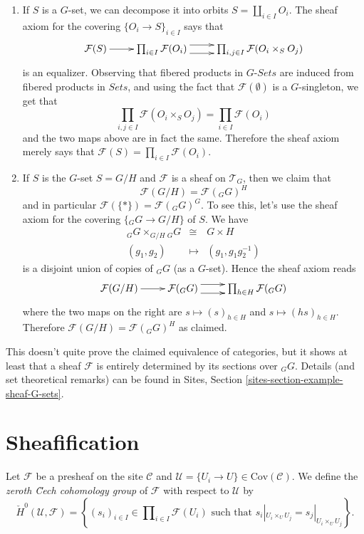 \begin{enumerate}
\item
If $S$ is a $G$-set, we can decompose it into orbits $S = \coprod_{i\in I}
O_i$. The sheaf axiom for the covering $\{O_i \to S\}_{i\in I}$ says that
$$
\xymatrix{
\mathcal{F}(S) \ar[r] &
\prod_{i\in I} \mathcal{F}(O_i) \ar@<1ex>[r] \ar@<-1ex>[r] &
\prod_{i,j \in I} \mathcal{F}(O_i \times_S O_j)
}
$$
is an equalizer. Observing that fibered products in $G\textit{-Sets}$ are
induced from fibered products in $\textit{Sets}$, and using the fact that
$\mathcal{F}(\emptyset)$ is a $G$-singleton, we get that
$$
\prod_{i,j \in I} \mathcal{F}(O_i \times_S O_j) = \prod_{i \in I}
\mathcal{F}(O_i)
$$
and the two maps above are in fact the same. Therefore the sheaf axiom merely
says that $\mathcal{F}(S) = \prod_{i\in I} \mathcal{F}(O_i)$.
\item
If $S$ is the $G$-set $S= G/H$ and $\mathcal{F}$ is a sheaf on $\mathcal{T}_G$,
then we claim that
$$
\mathcal{F}(G/H) = \mathcal{F}({}_G G)^H
$$
and in particular $\mathcal{F}(\{*\}) = \mathcal{F}({}_G G)^G$. To see this,
let's use the sheaf axiom for the covering $\{ {}_G G \to G/H \}$ of $S$. We
have
\begin{eqnarray*}
{}_G G \times_{G/H} {}_G G & \cong & G \times H \\
(g_1, g_2) & \longmapsto & (g_1, g_1 g_2^{-1})
\end{eqnarray*}
is a disjoint union of copies of ${}_G G$ (as a $G$-set). Hence the sheaf axiom
reads
$$
\xymatrix{
\mathcal{F} (G/H) \ar[r] &
\mathcal{F}({}_G G) \ar@<1ex>[r] \ar@<-1ex>[r] &
\prod_{h\in H} \mathcal{F}({}_G G)
}
$$
where the two maps on the right are $s \mapsto (s)_{h \in H}$ and $s \mapsto
(hs)_{h \in H}$. Therefore $\mathcal{F}(G/H) = \mathcal{F}({}_G G)^H$ as
claimed.
\end{enumerate}
This doesn't quite prove the claimed equivalence of categories, but it shows at
least that a sheaf $\mathcal{F}$ is entirely determined by its sections over
${}_G G$. Details (and set theoretical remarks) can be found in
Sites, Section \ref{sites-section-example-sheaf-G-sets}.




\section{Sheafification}
\label{section-sheafification}

\begin{definition}
\label{definition-0-cech}
Let $\mathcal{F}$ be a presheaf on the site $\mathcal{C}$ and
$\mathcal{U} = \{U_i \to U\} \in \text{Cov} (\mathcal{C})$.
We define the {\it zeroth \u Cech cohomology group} of
$\mathcal{F}$ with respect to $\mathcal{U}$ by
$$
\check H^0 (\mathcal{U}, \mathcal{F}) =
\left\{
(s_i)_{i\in I} \in \prod\nolimits_{i\in I }\mathcal{F}(U_i)
\text{ such that }
s_i|_{U_i \times_U U_j} = s_j |_{U_i \times_U U_j}
\right\}.
$$
\end{definition}


